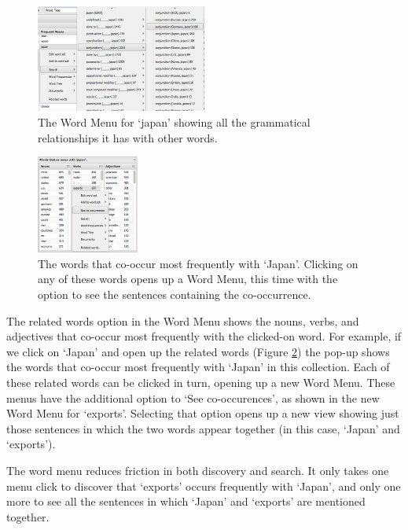 \documentclass{sig-alternate}
\begin{document}
\begin{figure}[ht!]
\begin{center}
	\includegraphics[width=0.5\textwidth]{fig/intro/08.png}
\end{center}
    \caption{%
      The Word Menu for `japan' showing all the grammatical relationships it has with other words. \label{fig:intro08}}%
\end{figure}


\begin{figure}[ht!]
\begin{center}
	\includegraphics[width=0.3\textwidth]{fig/intro/09.png}
\end{center}
    \caption{%
 		The words that co-occur most frequently with `Japan'. Clicking on any of these words opens up a Word Menu, this time with the option to see the sentences containing the co-occurrence.
	\label{fig:intro09}}%
\end{figure}

The related words option in the Word Menu shows the nouns, verbs, and adjectives that co-occur most frequently with the clicked-on word. For example, if we click on `Japan' and open up the related words (Figure \ref{fig:intro09}) the pop-up shows the words that co-occur most frequently with `Japan' in this collection. Each of these related words can be clicked in turn, opening up a new Word Menu. These menus have the additional option to `See co-occurences', as shown in the new Word Menu for `exports'.  Selecting that option opens up a new view showing just those sentences in which the two words appear together  (in this case, `Japan' and `exports').  

The word menu reduces friction in both discovery and search. It only takes one menu click to discover that `exports' occurs frequently with `Japan', and only one more to see all the sentences in which `Japan' and `exports' are mentioned together.  
\end{document}
